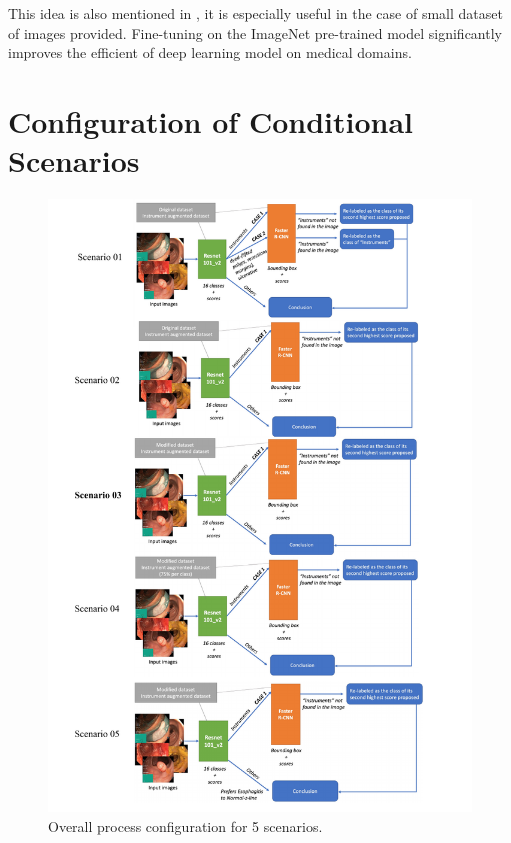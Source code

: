 This idea is also mentioned in \cite{trainingorfinetune}, it is especially useful in the case of small dataset of images provided. Fine-tuning on the ImageNet pre-trained model significantly improves the efficient of deep learning model on medical domains.

\section{Configuration of Conditional Scenarios}
\label{5runs_config}

\begin{figure}[tb!]
\begin{center}
\includegraphics[scale=0.75]{endoscopy_resources/5runs.pdf}
\end{center}
   \caption{Overall process configuration for 5 scenarios.}
\label{fig:5runs}
\end{figure}


